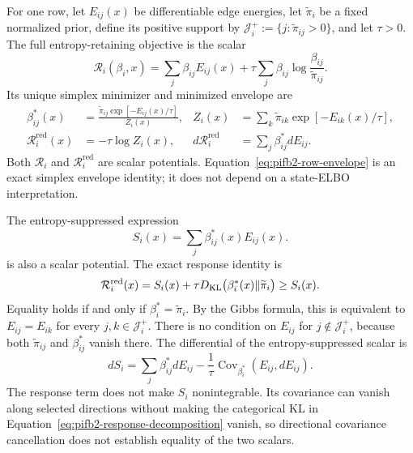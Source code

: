 For one row, let \(E_{ij}(x)\) be differentiable edge energies, let \(\widetilde\pi_i\) be a fixed normalized prior, define its positive support by \(\mathcal J_i^+:=\{j:\widetilde\pi_{ij}>0\}\), and let \(\tau>0\). The full entropy-retaining objective is the scalar
\begin{equation}
\mathcal R_i(\beta_i,x)
=\sum_j\beta_{ij}E_{ij}(x)
+\tau\sum_j\beta_{ij}\log\frac{\beta_{ij}}{\widetilde\pi_{ij}}.
\label{eq:pifb2-full-row-scalar}
\end{equation}
Its unique simplex minimizer and minimized envelope are
\begin{align}
\beta_{ij}^*(x)
&=\frac{\widetilde\pi_{ij}\exp[-E_{ij}(x)/\tau]}
{Z_i(x)},
&
Z_i(x)
&=\sum_k\widetilde\pi_{ik}\exp[-E_{ik}(x)/\tau],
\label{eq:pifb2-row-optimum}\\
\mathcal R_i^{\mathrm{red}}(x)
&=-\tau\log Z_i(x),
&
d\mathcal R_i^{\mathrm{red}}
&=\sum_j\beta_{ij}^*dE_{ij}.
\label{eq:pifb2-row-envelope}
\end{align}
Both \(\mathcal R_i\) and \(\mathcal R_i^{\mathrm{red}}\) are scalar potentials. Equation~\eqref{eq:pifb2-row-envelope} is an exact simplex envelope identity; it does not depend on a state-ELBO interpretation.

The entropy-suppressed expression
\begin{equation}
S_i(x)=\sum_j\beta_{ij}^*(x)E_{ij}(x).
\label{eq:pifb2-entropy-suppressed-scalar}
\end{equation}
is also a scalar potential. The exact response identity is
\begin{equation}
\mathcal R_i^{\mathrm{red}}(x)
=S_i(x)+\tau D_{\mathrm{KL}}\bigl(\beta_i^*(x)\Vert\widetilde\pi_i\bigr)
\geq S_i(x).
\label{eq:pifb2-response-decomposition}
\end{equation}
Equality holds if and only if \(\beta_i^*=\widetilde\pi_i\). By the Gibbs formula, this is equivalent to \(E_{ij}=E_{ik}\) for every \(j,k\in\mathcal J_i^+\). There is no condition on \(E_{ij}\) for \(j\notin\mathcal J_i^+\), because both \(\widetilde\pi_{ij}\) and \(\beta_{ij}^*\) vanish there. The differential of the entropy-suppressed scalar is
\begin{equation}
dS_i
=\sum_j\beta_{ij}^*dE_{ij}
-\frac{1}{\tau}
\operatorname{Cov}_{\beta_i^*}(E_{ij},dE_{ij}).
\label{eq:pifb2-entropy-suppressed-differential}
\end{equation}
The response term does not make \(S_i\) nonintegrable. Its covariance can vanish along selected directions without making the categorical KL in Equation~\eqref{eq:pifb2-response-decomposition} vanish, so directional covariance cancellation does not establish equality of the two scalars.

